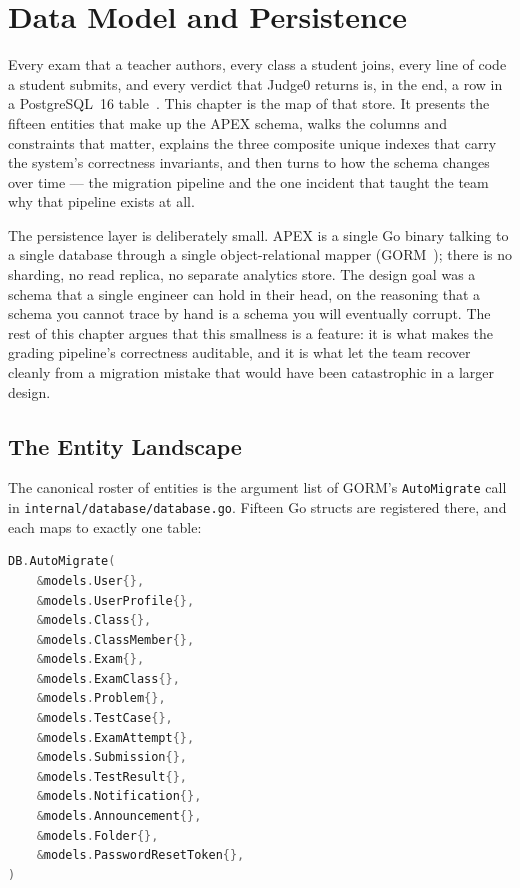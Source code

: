 \chapter{Data Model and Persistence}\label{ch:ch05}

Every exam that a teacher authors, every class a student joins, every line
of code a student submits, and every verdict that Judge0 returns is, in the
end, a row in a PostgreSQL~16 table~\cite{postgres}. This chapter is the map
of that store. It presents the fifteen entities that make up the APEX schema,
walks the columns and constraints that matter, explains the three composite
unique indexes that carry the system's correctness invariants, and then
turns to how the schema changes over time --- the migration pipeline and the
one incident that taught the team why that pipeline exists at all.

The persistence layer is deliberately small. APEX is a single Go binary
talking to a single database through a single object-relational mapper
(GORM~\cite{gorm}); there is no sharding, no read replica, no separate
analytics store. The design goal was a schema that a single engineer can
hold in their head, on the reasoning that a schema you cannot trace by hand
is a schema you will eventually corrupt. The rest of this chapter argues that
this smallness is a feature: it is what makes the grading pipeline's
correctness auditable, and it is what let the team recover cleanly from a
migration mistake that would have been catastrophic in a larger design.

\section{The Entity Landscape}

The canonical roster of entities is the argument list of GORM's
\texttt{AutoMigrate} call in \texttt{internal/database/database.go}. Fifteen
Go structs are registered there, and each maps to exactly one table:

\begin{lstlisting}[language=Go,caption={The fifteen registered models, in migration order (internal/database/database.go).},label={lst:automigrate}]
DB.AutoMigrate(
    &models.User{},
    &models.UserProfile{},
    &models.Class{},
    &models.ClassMember{},
    &models.Exam{},
    &models.ExamClass{},
    &models.Problem{},
    &models.TestCase{},
    &models.ExamAttempt{},
    &models.Submission{},
    &models.TestResult{},
    &models.Notification{},
    &models.Announcement{},
    &models.Folder{},
    &models.PasswordResetToken{},
)
\end{lstlisting}

